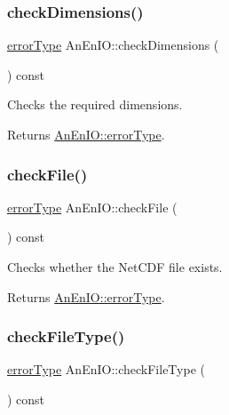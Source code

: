 \subsubsection{\texorpdfstring{check\+Dimensions()}{checkDimensions()}}
{\footnotesize\ttfamily \mbox{\hyperlink{class_an_en_i_o_aa56bc1ec6610b86db4349bce20f9ead0}{error\+Type}} An\+En\+I\+O\+::check\+Dimensions (\begin{DoxyParamCaption}{ }\end{DoxyParamCaption}) const}

Checks the required dimensions. \begin{DoxyReturn}{Returns}
\mbox{\hyperlink{class_an_en_i_o_aa56bc1ec6610b86db4349bce20f9ead0}{An\+En\+I\+O\+::error\+Type}}. 
\end{DoxyReturn}
\mbox{\label{class_an_en_i_o_adf0b96d441687159e1d884273847d68e}} 
\subsubsection{\texorpdfstring{check\+File()}{checkFile()}}
{\footnotesize\ttfamily \mbox{\hyperlink{class_an_en_i_o_aa56bc1ec6610b86db4349bce20f9ead0}{error\+Type}} An\+En\+I\+O\+::check\+File (\begin{DoxyParamCaption}{ }\end{DoxyParamCaption}) const}

Checks whether the Net\+C\+DF file exists.

\begin{DoxyReturn}{Returns}
\mbox{\hyperlink{class_an_en_i_o_aa56bc1ec6610b86db4349bce20f9ead0}{An\+En\+I\+O\+::error\+Type}}. 
\end{DoxyReturn}
\mbox{\label{class_an_en_i_o_aa9b4700db58d0ef09af429d5d31ff55f}} 
\subsubsection{\texorpdfstring{check\+File\+Type()}{checkFileType()}}
{\footnotesize\ttfamily \mbox{\hyperlink{class_an_en_i_o_aa56bc1ec6610b86db4349bce20f9ead0}{error\+Type}} An\+En\+I\+O\+::check\+File\+Type (\begin{DoxyParamCaption}{ }\end{DoxyParamCaption}) const}

